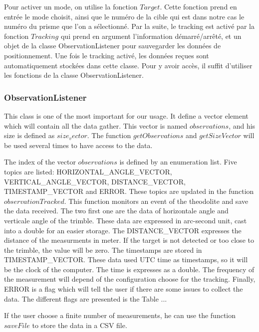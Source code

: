 \documentclass[10pt,letterpaper,oneside]{article}
\begin{document}
Pour activer un mode, on utilise la fonction $Target$.
Cette fonction prend en entrée le mode choisit, ainsi que le numéro de la cible qui est dans notre cas le numéro du prisme que l'on a sélectionné.
Par la suite, le tracking est activé par la fonction $Tracking$ qui prend en argument l'information démarré/arrêté, et un objet de la classe ObservationListener pour sauvegarder les données de positionnement.
Une fois le tracking activé, les données reçues sont automatiquement stockées dans cette classe.
Pour y avoir accès, il suffit d'utiliser les fonctions de la classe ObservationListener.

\subsubsection{ObservationListener}

This class is one of the most important for our usage.
It define a vector element which will contain all the data gather.
This vector is named $observations$, and his size is defined as $size_vector$.
The function $getObservations$ and $getSizeVector$ will be used several times to have access to the data.

The index of the vector $observations$ is defined by an enumeration list.
Five topics are listed: HORIZONTAL\_ANGLE\_VECTOR, VERTICAL\_ANGLE\_VECTOR, DISTANCE\_VECTOR, TIMESTAMP\_VECTOR and ERROR.
These topics are updated in the function $observationTracked$.
This function monitors an event of the theodolite and save the data received.
The two first one are the data of horizontale angle and verticale angle of the trimble.
These data are expressed in arc-second unit, cast into a double for an easier storage.
The DISTANCE\_VECTOR expresses the distance of the measurments in meter.
If the target is not detected or too close to the trimble, the value will be zero.
The timestamps are stored in TIMESTAMP\_VECTOR.
These data used UTC time as timestamps, so it will be the clock of the computer.
The time is expresses as a double.
The frequency of the measurement will depend of the configuration choose for the tracking.
Finally, ERROR is a flag which will tell the user if there are some issues to collect the data.
The different flags are presented is the Table ...


If the user choose a finite number of measurements, he can use the function $saveFile$ to store the data in a CSV file.
\end{document}
